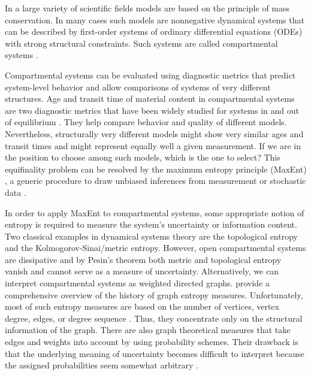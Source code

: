 \documentclass[smallextended]{svjour3}
\begin{document}
In a large variety of scientific fields models are based on the principle of mass conservation.
In many cases such models are nonnegative dynamical systems that can be described by first-order systems of ordinary differential equations (ODEs) with strong structural constraints.
Such systems are called compartmental systems \citealp{Anderson1983, Walter1999, Haddad2010}.

Compartmental systems can be evaluated using diagnostic metrics that predict system-level behavior and allow comparisons of systems of very different structures. 
Age and transit time of material content in compartmental systems  are two diagnostic metrics that have been widely studied for systems in and out of equilibrium \citep{Eriksson1971ARoEaS, Bolin1973tellus, Rasmussen2016JMB, Sierra2017GCB, Metzler2018MGS, MetzlerMuellerSierra2018PNAS}.
They help compare behavior and quality of different models.
Nevertheless, structurally very different models might show very similar ages and transit times and might represent equally well a given measurement.
If we are in the position to choose among such models, which is the one to select?
This equifinality problem can be resolved by the maximum entropy principle (MaxEnt) \citep{Jaynes1957PR1, Jaynes1957PR2}, a generic procedure to draw unbiased inferences from measurement or stochastic data \citep{Presse2013RMP, Golan2022}.

In order to apply MaxEnt to compartmental systems, some appropriate notion of entropy is required to measure the system's uncertainty or information content.
Two classical examples in dynamical systems theory are the topological entropy and the Kolmogorov-Sinai/metric entropy.
However, open compartmental systems are dissipative and by Pesin's theorem \citep{Pesin1977UMN} both metric and topological entropy vanish and cannot serve as a measure of uncertainty.
Alternatively, we can interpret compartmental systems as weighted directed graphs.
\citet{Dehmer2011IS} provide a comprehensive overview of the history of graph entropy measures.
Unfortunately, most of such entropy measures are based on the number of vertices, vertex degree, edges, or degree sequence \citep{Trucco1956BoMB, Morzy2017}.
Thus, they concentrate only on the structural information of the graph.
There are also graph theoretical measures that take edges and weights into account by using probability schemes.
Their drawback is that the underlying meaning of uncertainty becomes difficult to interpret because the assigned probabilities seem somewhat arbitrary \citep{Bonchev2005}.
\end{document}
